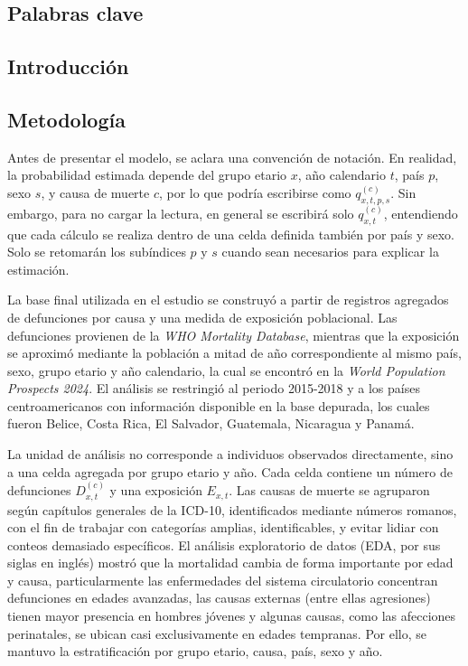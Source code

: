 \documentclass[
  spanish,
  letterpaper,
  DIV=11,
  numbers=noendperiod]{scrartcl}
\begin{document}
\subsection{Palabras clave}\label{palabras-clave}

\subsection{Introducción}\label{introducciuxf3n}

\subsection{Metodología}\label{metodologuxeda}

Antes de presentar el modelo, se aclara una convención de notación. En
realidad, la probabilidad estimada depende del grupo etario \(x\), año
calendario \(t\), país \(p\), sexo \(s\), y causa de muerte \(c\), por
lo que podría escribirse como \(q_{x,t,p,s}^{(c)}\). Sin embargo, para
no cargar la lectura, en general se escribirá solo \(q_{x,t}^{(c)}\),
entendiendo que cada cálculo se realiza dentro de una celda definida
también por país y sexo. Solo se retomarán los subíndices \(p\) y \(s\)
cuando sean necesarios para explicar la estimación.

La base final utilizada en el estudio se construyó a partir de registros
agregados de defunciones por causa y una medida de exposición
poblacional. Las defunciones provienen de la \emph{WHO Mortality
Database}, mientras que la exposición se aproximó mediante la población
a mitad de año correspondiente al mismo país, sexo, grupo etario y año
calendario, la cual se encontró en la \emph{World Population Prospects
2024}. El análisis se restringió al periodo 2015-2018 y a los países
centroamericanos con información disponible en la base depurada, los
cuales fueron Belice, Costa Rica, El Salvador, Guatemala, Nicaragua y
Panamá.

La unidad de análisis no corresponde a individuos observados
directamente, sino a una celda agregada por grupo etario y año. Cada
celda contiene un número de defunciones \(D_{x,t}^{(c)}\) y una
exposición \(E_{x,t}\). Las causas de muerte se agruparon según
capítulos generales de la ICD-10, identificados mediante números
romanos, con el fin de trabajar con categorías amplias, identificables,
y evitar lidiar con conteos demasiado específicos. El análisis
exploratorio de datos (EDA, por sus siglas en inglés) mostró que la
mortalidad cambia de forma importante por edad y causa, particularmente
las enfermedades del sistema circulatorio concentran defunciones en
edades avanzadas, las causas externas (entre ellas agresiones) tienen
mayor presencia en hombres jóvenes y algunas causas, como las afecciones
perinatales, se ubican casi exclusivamente en edades tempranas. Por
ello, se mantuvo la estratificación por grupo etario, causa, país, sexo
y año.
\end{document}
